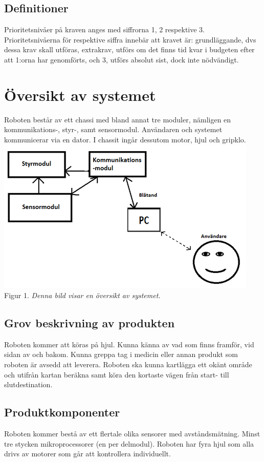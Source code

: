\documentclass[11pt]{article}
\begin{document}
\begin{flushleft}
\subsection{Definitioner}
Prioritetsnivåer på kraven anges med siffrorna 1, 2 respektive 3. Prioritetsnivåerna för respektive siffra innebär att kravet är: grundläggande, dvs dessa krav skall utföras, extrakrav, utförs om det finns tid kvar i budgeten efter att 1:orna har genomförts, och 3, utförs absolut sist, dock inte nödvändigt.

\pagebreak

\section{Översikt av systemet}
Roboten består av ett chassi med bland annat tre moduler, nämligen en kommunikations-, styr-, samt sensormodul. Användaren och systemet kommunicerar via en dator. I chassit ingår dessutom motor, hjul och gripklo.
\includegraphics{systemskiss}
\\
Figur 1. \textit{Denna bild visar en översikt av systemet.}

\subsection{Grov beskrivning av produkten}
Roboten kommer att köras på hjul. Kunna känna av vad som finns framför, vid sidan av och bakom. Kunna greppa tag i medicin eller annan produkt som roboten är avsedd att leverera. Roboten ska kunna kartlägga ett okänt område och utifrån kartan beräkna samt köra den kortaste vägen från start- till slutdestination. 

\subsection{Produktkomponenter}
Roboten kommer bestå av ett flertale olika sensorer med avståndsmätning. Minst tre stycken mikroprocessorer (en per delmodul). Roboten har fyra hjul som alla drivs av motorer som går att kontrollera individuellt.


\end{flushleft}
\end{document}
